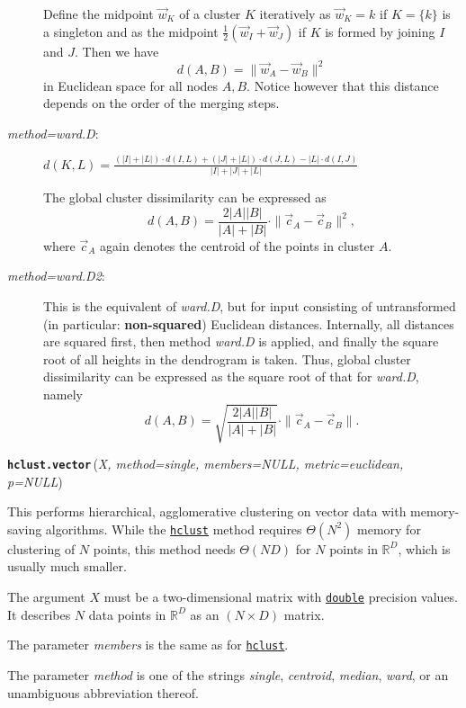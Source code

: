 \documentclass[fontsize=10pt,paper=letter,BCOR=-6mm,DIV=8]{scrartcl}
\makeatletter
\newcommand*\q{\textquotesingle}
\newcommand*\double{\href{https://stat.ethz.ch/R-manual/R-patched/library/base/html/double.html}{\texttt{double}}}
\newenvironment{methods}{%
  \list{}{\labelwidth\z@
    \itemindent-\leftmargin
    \let\makelabel\methodslabel}%
}{%
  \endlist
}
\newcommand*{\methodslabel}[1]{%
  \hbox to \textwidth{\hspace{\labelsep}%
  \normalfont\bfseries\ttfamily
  #1\hskip-\labelsep\hfill}%
}
\makeatother
\begin{document}
\begin{methods}
\begin{description}
Define the midpoint $\vec w_K$ of a cluster $K$ iteratively as $\vec w_K=k$ if $K=\{k\}$ is a singleton and as the midpoint $\frac12(\vec w_I+\vec w_J)$ if $K$ is formed by joining $I$ and $J$. Then we have
\[
 d(A,B)=\|\vec w_A-\vec w_B\|^2
\]
in Euclidean space for all nodes $A,B$. Notice however that this distance depends on the order of the merging steps.

\item [\normalfont\textit{method=\q ward.D\q}:]
$\displaystyle d(K,L) = \frac{(|I|+|L|)\cdot d(I,L)+(|J|+|L|)\cdot d(J,L)-|L|\cdot d(I,J)}{|I|+|J|+|L|}$

The global cluster dissimilarity can be expressed as
\[
d(A,B)=\frac{2|A||B|}{|A|+|B|}\cdot\|\vec c_A-\vec c_B\|^2,
\]
where $\vec c_A$ again denotes the centroid of the points in cluster $A$.

\item [\normalfont\textit{method=\q ward.D2\q}:]
This is the equivalent of \textit{\q ward.D\q}, but for input consisting of untransformed (in particular: \textbf{non-squared}) Euclidean distances. Internally, all distances are squared first, then method \textit{ward.D} is applied, and finally the square root of all heights in the dendrogram is taken. Thus, global cluster dissimilarity can be expressed as the square root of that for \textit{ward.D}, namely
\[
d(A,B)=\sqrt{\frac{2|A||B|}{|A|+|B|}}\cdot\|\vec c_A-\vec c_B\|.
\]
\end{description}

\item [\normalfont\texttt{\textbf{hclust.vector}}\,(\textit{X, method=\q single\q, members=NULL, metric=\q euclidean\q, p=NULL})]
\label{hclust.vector}
This performs hierarchical, agglomerative clustering on vector data with memory-saving algorithms. While the \hyperref[hclust]{\texttt{hclust}} method requires $\Theta(N^2)$ memory for clustering of $N$ points, this method needs $\Theta(ND)$ for $N$ points in $\mathbb R^D$, which is usually much smaller.

The argument $X$ must be a two-dimensional matrix with \double{} precision values. It describes $N$ data points in $\mathbb R^D$ as an $(N\times D)$ matrix.

The parameter \textit{\q members\q} is the same as for \hyperref[hclust]{\texttt{hclust}}.

The parameter \textit{\q method\q} is one of the strings \textit{\q single\q}, \textit{\q centroid\q}, \textit{\q median\q}, \textit{\q ward\q}, or an unambiguous abbreviation thereof.


\end{methods}
\end{document}
